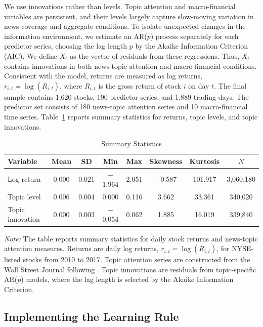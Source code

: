 We use innovations rather than levels. Topic attention and macro-financial variables are persistent, and their levels largely capture slow-moving variation in news coverage and aggregate conditions. To isolate unexpected changes in the information environment, we estimate an AR($p$) process separately for each predictor series, choosing the lag length $p$ by the Akaike Information Criterion (AIC). We define $X_t$ as the vector of residuals from these regressions. Thus, $X_t$ contains innovations in both news-topic attention and macro-financial conditions.
Consistent with the model, returns are measured as log returns,
$r_{i,t} = \log(R_{i,t})$,
where $R_{i,t}$ is the gross return of stock $i$ on day $t$.
The final sample contains 1{,}620 stocks, 190 predictor series, and 1{,}889 trading days. The predictor set consists of 180 news-topic attention series and 10 macro-financial time series. Table~\ref{tab:summary_stats} reports summary statistics for returns, topic levels, and topic innovations.


\begin{table}[H]
\centering
\caption{Summary Statistics}
\label{tab:summary_stats}

\begin{tabular}{lccccccc}
\toprule
Variable & Mean & SD & Min & Max & Skewness & Kurtosis & $N$ \\
\midrule
Log return
    & 0.000 & 0.021 & $-$1.964 & 2.051 & $-$0.587 & 101.917 & 3,060,180 \\
\addlinespace
Topic level
    & 0.006 & 0.004 & 0.000 & 0.116 & 3.662 & 33.361 & 340,020 \\
Topic innovation
    & 0.000 & 0.003 & $-$0.054 & 0.062 & 1.885 & 16.019 & 339,840 \\
\bottomrule
\end{tabular}

\medskip
\begin{minipage}{0.95\textwidth}
\footnotesize
\textit{Note:} The table reports summary statistics for daily stock returns and news-topic attention measures. Returns are daily log returns, $r_{i,t}=\log(R_{i,t})$, for NYSE-listed stocks from 2010 to 2017. Topic attention series are constructed from the Wall Street Journal following \citet{Bybee2021}. Topic innovations are residuals from topic-specific AR($p$) models, where the lag length is selected by the Akaike Information Criterion.
\end{minipage}
\end{table}


\subsection{Implementing the Learning Rule}\label{subsec:empirical_learning_rule}

